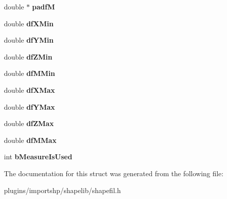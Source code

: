 \begin{DoxyCompactItemize}
\item 
\hypertarget{structSHPObject_ad6778dd6e39d9590cde7dd5bd8761442}{double $\ast$ {\bfseries padf\-M}}\label{structSHPObject_ad6778dd6e39d9590cde7dd5bd8761442}

\item 
\hypertarget{structSHPObject_ad685848cd21ef75559141af0484456d0}{double {\bfseries df\-X\-Min}}\label{structSHPObject_ad685848cd21ef75559141af0484456d0}

\item 
\hypertarget{structSHPObject_a96fb3abc66d3aa639b4bbc4c73e03c99}{double {\bfseries df\-Y\-Min}}\label{structSHPObject_a96fb3abc66d3aa639b4bbc4c73e03c99}

\item 
\hypertarget{structSHPObject_a3dbf7afec18ae0a94fe5600d01c39833}{double {\bfseries df\-Z\-Min}}\label{structSHPObject_a3dbf7afec18ae0a94fe5600d01c39833}

\item 
\hypertarget{structSHPObject_a7315f2b4d41a66b9f54a16a4395e4ee0}{double {\bfseries df\-M\-Min}}\label{structSHPObject_a7315f2b4d41a66b9f54a16a4395e4ee0}

\item 
\hypertarget{structSHPObject_a57913d0f9ffce115fa944bc56b51fcd7}{double {\bfseries df\-X\-Max}}\label{structSHPObject_a57913d0f9ffce115fa944bc56b51fcd7}

\item 
\hypertarget{structSHPObject_a6444703e923ba9e9e12c783dea81e6b4}{double {\bfseries df\-Y\-Max}}\label{structSHPObject_a6444703e923ba9e9e12c783dea81e6b4}

\item 
\hypertarget{structSHPObject_a45afd311a661d8264cdcf98dbe9af454}{double {\bfseries df\-Z\-Max}}\label{structSHPObject_a45afd311a661d8264cdcf98dbe9af454}

\item 
\hypertarget{structSHPObject_a94308f00c2e474027ddafd2ad4def7eb}{double {\bfseries df\-M\-Max}}\label{structSHPObject_a94308f00c2e474027ddafd2ad4def7eb}

\item 
\hypertarget{structSHPObject_a469e821a4f9180c64ecd98270ccd7faf}{int {\bfseries b\-Measure\-Is\-Used}}\label{structSHPObject_a469e821a4f9180c64ecd98270ccd7faf}

\end{DoxyCompactItemize}


The documentation for this struct was generated from the following file\-:\begin{DoxyCompactItemize}
\item 
plugins/importshp/shapelib/shapefil.\-h\end{DoxyCompactItemize}
